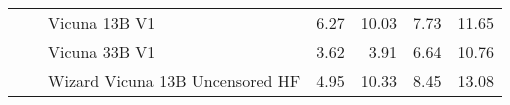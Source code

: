 \begin{table}[ht]
\begin{tabular}{l|l|l|rrrr}
 &  & Vicuna 13B V1 & {\cellcolor[HTML]{F2FAFC}} \color[HTML]{000000} 6.27 & {\cellcolor[HTML]{ECF8FA}} \color[HTML]{000000} 10.03 & {\cellcolor[HTML]{F0F9FB}} \color[HTML]{000000} 7.73 & {\cellcolor[HTML]{E9F7FA}} \color[HTML]{000000} 11.65 \\
 &  & Vicuna 33B V1 & {\cellcolor[HTML]{F7FCFD}} \color[HTML]{000000} 3.62 & {\cellcolor[HTML]{F7FCFD}} \color[HTML]{000000} 3.91 & {\cellcolor[HTML]{F2FAFC}} \color[HTML]{000000} 6.64 & {\cellcolor[HTML]{EBF7FA}} \color[HTML]{000000} 10.76 \\
 &  & Wizard Vicuna 13B Uncensored HF & {\cellcolor[HTML]{F5FBFC}} \color[HTML]{000000} 4.95 & {\cellcolor[HTML]{ECF8FA}} \color[HTML]{000000} 10.33 & {\cellcolor[HTML]{EFF9FB}} \color[HTML]{000000} 8.45 & {\cellcolor[HTML]{E7F6F9}} \color[HTML]{000000} 13.08 \\


\end{tabular}
\end{table}
